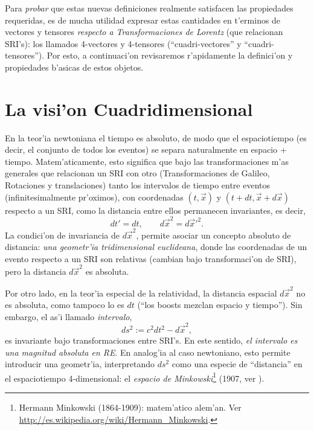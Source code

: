 Para \textit{probar} que estas nuevas definiciones realmente satisfacen las propiedades requeridas, es de mucha utilidad expresar estas cantidades en t'erminos de vectores y tensores \textit{respecto a Transformaciones de Lorentz} (que relacionan SRI's): los llamados 4-vectores y 4-tensores (``cuadri-vectores'' y ``cuadri-tensores''). Por esto, a continuaci'on revisaremos r'apidamente la definici'on y propiedades b'asicas de estos objetos.


\section{La visi'on Cuadridimensional}
En la teor'ia newtoniana el tiempo es absoluto, de modo que el espaciotiempo (es decir, el conjunto de todos los eventos) se separa naturalmente en espacio + tiempo. Matem'aticamente, esto significa que
bajo las transformaciones m'as generales que relacionan un SRI con otro
(Transformaciones de Galileo, Rotaciones y translaciones) tanto los intervalos de
tiempo entre eventos (infinitesimalmente pr'oximos), con coordenadas
$(t,\vec{x})$ y $(t+dt,\vec{x}+d\vec{x})$ respecto a un SRI, como la
distancia entre ellos permanecen invariantes, es decir,
\begin{equation}
dt'=dt, \qquad d\vec{x}^2=d\vec{x}'^2.
\end{equation}
La condici'on de invariancia de $d\vec{x}^2$, permite asociar un concepto
absoluto de distancia: \textit{una geometr'ia tridimensional euclideana}, donde las coordenadas de un evento respecto a un SRI son relativas (cambian bajo transformaci'on de SRI), pero la distancia $d\vec{x}^2$ es absoluta.

Por otro lado, en la teor'ia especial de la relatividad, la distancia espacial $d\vec{x}^2$ no es absoluta, como tampoco lo es $dt$ (``los boosts mezclan espacio y tiempo''). Sin embargo, el as'i llamado \textit{intervalo},
\begin{equation}
ds^2:=c^2dt^2-d\vec{x}^2, \label{ds}
\end{equation}
es invariante bajo transformaciones entre SRI's. En este sentido, \textit{el
intervalo es una magnitud absoluta en RE}. En analog'ia al caso newtoniano, esto permite introducir una geometr'ia, interpretando $ds^2$ como una especie de ``distancia'' en el espaciotiempo 4-dimensional: el \textit{espacio de Minkowski}\footnote{Hermann Minkowski (1864-1909): matem'atico alem'an. Ver \url{http://es.wikipedia.org/wiki/Hermann_Minkowski}.} (1907, ver \cite{Minkowski07}).

